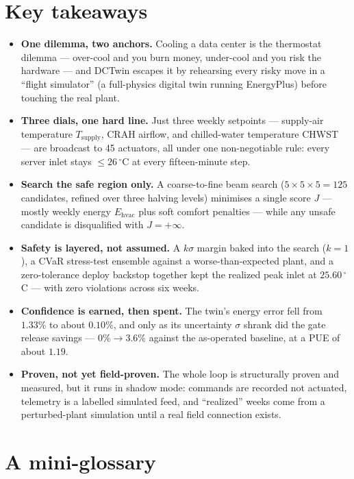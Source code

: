 \documentclass[11pt]{report}
\begin{document}
\section*{Key takeaways}

\begin{keyidea}
\begin{itemize}
  \item \textbf{One dilemma, two anchors.} Cooling a data center is the thermostat dilemma --- over-cool and you burn money, under-cool and you risk the hardware --- and DCTwin escapes it by rehearsing every risky move in a ``flight simulator'' (a full-physics digital twin running EnergyPlus) before touching the real plant.
  \item \textbf{Three dials, one hard line.} Just three weekly setpoints --- supply-air temperature $T_{\text{supply}}$, CRAH airflow, and chilled-water temperature CHWST --- are broadcast to 45 actuators, all under one non-negotiable rule: every server inlet stays $\le 26\,^\circ$C at every fifteen-minute step.
  \item \textbf{Search the safe region only.} A coarse-to-fine beam search ($5\times5\times5 = 125$ candidates, refined over three halving levels) minimises a single score $J$ --- mostly weekly energy $E_{\text{hvac}}$ plus soft comfort penalties --- while any unsafe candidate is disqualified with $J = +\infty$.
  \item \textbf{Safety is layered, not assumed.} A $k\sigma$ margin baked into the search ($k=1$), a CVaR stress-test ensemble against a worse-than-expected plant, and a zero-tolerance deploy backstop together kept the realized peak inlet at $25.60\,^\circ$C --- with zero violations across six weeks.
  \item \textbf{Confidence is earned, then spent.} The twin's energy error fell from $1.33\%$ to about $0.10\%$, and only as its uncertainty $\sigma$ shrank did the gate release savings --- $0\% \to 3.6\%$ against the as-operated baseline, at a PUE of about $1.19$.
  \item \textbf{Proven, not yet field-proven.} The whole loop is structurally proven and measured, but it runs in shadow mode: commands are recorded not actuated, telemetry is a labelled simulated feed, and ``realized'' weeks come from a perturbed-plant simulation until a real field connection exists.
\end{itemize}
\end{keyidea}

\section*{A mini-glossary}
\end{document}
